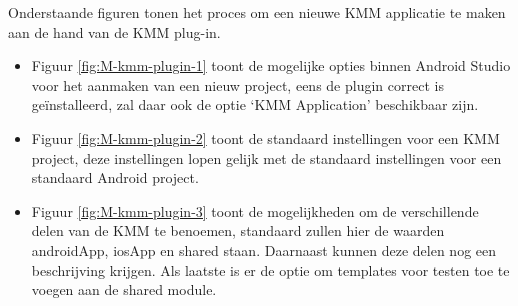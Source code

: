     Onderstaande figuren tonen het proces om een nieuwe KMM applicatie te maken aan de hand van de KMM plug-in. 
    \begin{itemize}
        \item Figuur \ref{fig:M-kmm-plugin-1} toont de mogelijke opties binnen Android Studio voor het aanmaken van een nieuw project, eens de plugin correct is geïnstalleerd, zal daar ook de optie  `KMM Application' beschikbaar zijn.
        \item Figuur \ref{fig:M-kmm-plugin-2} toont de standaard instellingen voor een KMM project, deze instellingen lopen gelijk met de standaard instellingen voor een standaard Android project.
        \item Figuur \ref{fig:M-kmm-plugin-3} toont de mogelijkheden om de verschillende delen van de KMM te benoemen, standaard zullen hier de waarden androidApp, iosApp en shared staan. Daarnaast kunnen deze delen nog een beschrijving krijgen. Als laatste is er de optie om templates voor testen toe te voegen aan de shared module.
    \end{itemize}
 
